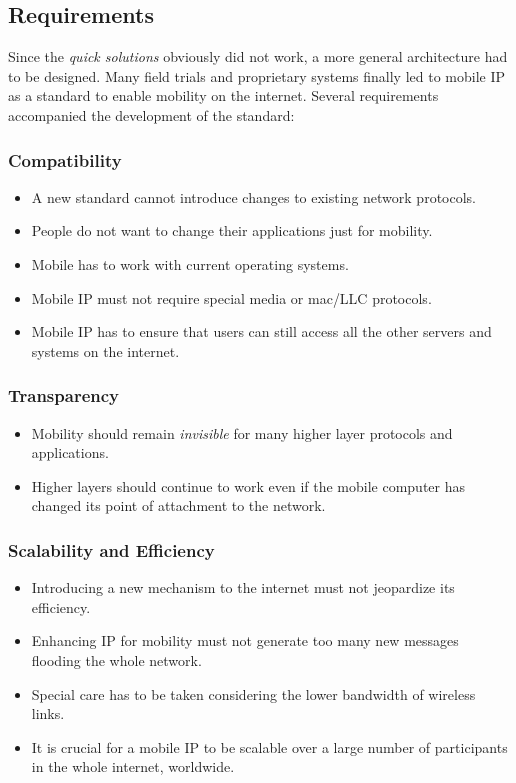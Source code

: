\subsection{Requirements}
Since the \textit{quick solutions} obviously did not work, a more general architecture had to be designed. Many field trials and proprietary systems finally led to mobile IP as a standard to enable mobility on the internet. Several requirements accompanied the development of the standard:


\subsubsection{Compatibility}
\begin{itemize}
	\item A new standard cannot introduce changes to existing network protocols.
	\item People do not want to change their applications just for mobility.
	\item Mobile has to work with current operating systems.
	\item Mobile IP must not require special media or \gls{mac}/LLC protocols.
	\item Mobile IP has to ensure that users can still access all the other servers and systems	on the internet.
\end{itemize}

\subsubsection{Transparency}

\begin{itemize}
	\item Mobility should remain \textit{invisible} for many higher layer protocols and applications.  
	\item Higher layers should continue to work even if	the mobile computer has changed its point of attachment to the network.
\end{itemize}


\subsubsection{Scalability and Efficiency}
\begin{itemize}
\item Introducing a new mechanism to the internet must not jeopardize its efficiency. 
	\item Enhancing IP for mobility must not generate too many new messages flooding the whole network.
	\item Special care has to be taken considering the lower bandwidth of wireless links.
	\item It is crucial for a mobile IP to be scalable over a large number of participants in the whole internet, worldwide.
\end{itemize}

